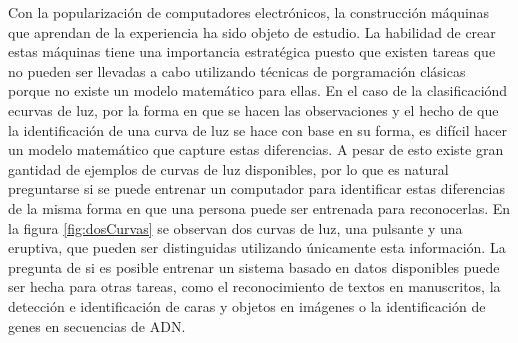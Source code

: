 \documentclass[letterpaper,12pt]{book}
\begin{document}
Con la popularización de computadores electrónicos, la construcción máquinas que aprendan de la experiencia ha sido objeto de estudio. La habilidad de crear estas máquinas tiene una importancia estratégica puesto que existen tareas que no pueden ser llevadas a cabo utilizando técnicas de porgramación clásicas porque no existe un modelo matemático para ellas. En el caso de la clasificaciónd ecurvas de luz, por la forma en que se hacen las observaciones y el hecho de que la identificación de una curva de luz se hace con base en su forma, es difícil hacer un modelo matemático que capture estas diferencias. A pesar de esto existe gran gantidad de ejemplos de curvas de luz disponibles, por lo que es natural preguntarse si se puede entrenar un computador para identificar estas diferencias de la misma forma en que una persona puede ser entrenada para reconocerlas. En la figura \ref{fig:dosCurvas} se observan dos curvas de luz, una pulsante y una eruptiva, que pueden ser distinguidas utilizando únicamente esta información. La pregunta de si es posible entrenar un sistema basado en datos disponibles puede ser hecha para otras tareas, como el reconocimiento de textos en manuscritos, la detección e identificación de caras y objetos en imágenes o la identificación de genes en secuencias de ADN. 
\end{document}
